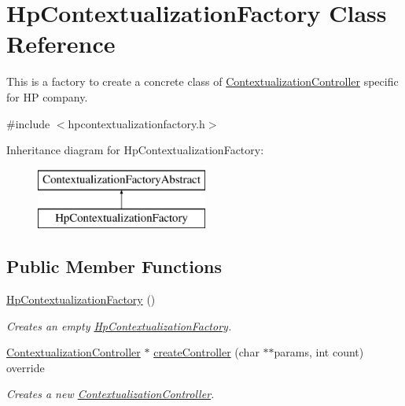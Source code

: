 \hypertarget{classHpContextualizationFactory}{}\section{Hp\+Contextualization\+Factory Class Reference}
\label{classHpContextualizationFactory}


This is a factory to create a concrete class of \mbox{\hyperlink{classContextualizationController}{Contextualization\+Controller}} specific for HP company.  




{\ttfamily \#include $<$hpcontextualizationfactory.\+h$>$}

Inheritance diagram for Hp\+Contextualization\+Factory\+:\begin{figure}[H]
\begin{center}
\leavevmode
\includegraphics[height=2.000000cm]{classHpContextualizationFactory}
\end{center}
\end{figure}
\subsection*{Public Member Functions}
\begin{DoxyCompactItemize}
\item 
\mbox{\label{classHpContextualizationFactory_afee11305ab5203745cddd4a837542ea3}} 
\mbox{\hyperlink{classHpContextualizationFactory_afee11305ab5203745cddd4a837542ea3}{Hp\+Contextualization\+Factory}} ()
\begin{DoxyCompactList}\small\item\em Creates an empty \mbox{\hyperlink{classHpContextualizationFactory}{Hp\+Contextualization\+Factory}}. \end{DoxyCompactList}\item 
\mbox{\hyperlink{classContextualizationController}{Contextualization\+Controller}} $\ast$ \mbox{\hyperlink{classHpContextualizationFactory_ad9d9c11a2827c8854c4cadbf38b4e7ca}{create\+Controller}} (char $\ast$$\ast$params, int count) override
\begin{DoxyCompactList}\small\item\em Creates a new \mbox{\hyperlink{classContextualizationController}{Contextualization\+Controller}}. \end{DoxyCompactList}\end{DoxyCompactItemize}
